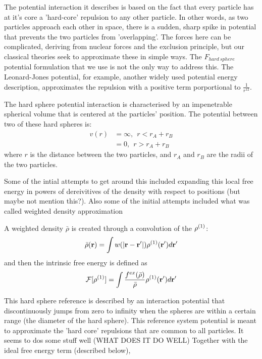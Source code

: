 The potential interaction it describes is based on the fact that every
particle has at it's core a 'hard-core' repulsion to any other
particle.  In other words, as two particles approach each other in
space, there is a sudden, sharp spike in potential that prevents the
two particles from 'overlapping'.  The forces here can be complicated,
deriving from nuclear forces and the exclusion principle, but our
classical theories seek to approximate these in simple ways.  The
$F_{hard~sphere}$ potential formulation that we use is not the only
way to address this.  The Leonard-Jones potential, for example,
another widely used potential energy description, approximates the
repulsion with a positive term porportional to $\frac{1}{r^{12}}$.

The hard sphere potential interaction is characterised by an
impenetrable spherical volume that is centered at the particles'
position.  The potential between two of these hard spheres is:
\begin{align}
  v(r) &= \infty,~~ r < r_A + r_B \\
  &= 0,~~ r > r_A + r_B
\end{align}
where $r$ is the distance between the two particles, and $r_A$ and
$r_B$ are the radii of the two particles.

Some of the intial attempts to get around this included expanding this
local free energy in powers of dereivitives of the density with
respect to positions (but maybe not mention this?).  Also some of the
initial attempts included what was called weighted density
approximation

A weighted density $\bar{\rho}$ is created through a convolution of
the $\rho^{(1)}$:
\begin{align}
  \bar{\rho}(\textbf{r}) = \int w(|\textbf{r}-\textbf{r}'|) \rho^{(1)}(\textbf{r}') d\textbf{r}'
\end{align}
and then the intrinsic free energy is defined as
\begin{align}
  \mathcal{F}[\rho^{(1)}] = \int \frac{f^{ex}(\bar{\rho})}{\bar{\rho}} \rho^{(1)}(\textbf{r}') d\textbf{r}'
\end{align}


This hard sphere reference is described by an interaction
potential that discontinuously jumps from zero to infinity when the
spheres are within a certain range (the diameter of the hard
sphere).  This reference system potential is meant to approximate
the 'hard core' repulsions that are common to all particles.  It
seems to dos some stuff well (WHAT DOES IT DO WELL) Together with
the ideal free energy term (described below),



